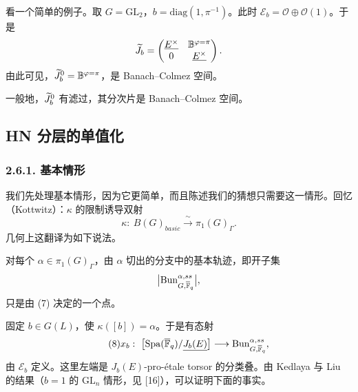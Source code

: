 \begin{example}\label{ex:2.24}
看一个简单的例子。取 $G=\mathrm{GL}_2$，$b=\mathrm{diag}(1,\pi^{-1})$。此时 $\mathcal{E}_b=\mathcal{O}\oplus\mathcal{O}(1)$。于是
\[
\widetilde{J}_b=\begin{pmatrix}\underline{E^\times} & \mathbb{B}^{\varphi=\pi}\\ 0 & \underline{E^\times}\end{pmatrix}.
\]
由此可见，$\widetilde{J}_b^0=\mathbb{B}^{\varphi=\pi}$，是 Banach–Colmez 空间。
\end{example}

一般地，$\widetilde{J}_b^0$ 有滤过，其分次片是 Banach–Colmez 空间。

\subsection{HN 分层的单值化}%

\subsubsection*{2.6.1. 基本情形}%

我们先处理基本情形，因为它更简单，而且陈述我们的猜想只需要这一情形。回忆（Kottwitz）：$\kappa$ 的限制诱导双射
\begin{equation}\tag{7}\label{eq:2.7}
\kappa:\ B(G)_{basic}\xrightarrow{\ \sim\ }\pi_1(G)_\Gamma.
\end{equation}
几何上这翻译为如下说法。

\begin{proposition}\label{prop:2.25}
对每个 $\alpha\in\pi_1(G)_\Gamma$，由 $\alpha$ 切出的分支中的基本轨迹，即开子集
\[
\bigl|\mathrm{Bun}^{\alpha,ss}_{G,\overline{\mathbb{F}}_q}\bigr|,
\]
只是由 (7) 决定的一个点。
\end{proposition}


固定 $b\in G(L)$，使 $\kappa([b])=\alpha$。于是有态射
\begin{equation}\tag{8}\label{eq:2.8}
x_b:\ \bigl[\mathrm{Spa}(\overline{\mathbb{F}}_q)/\underline{J_b(E)}\bigr]\longrightarrow \mathrm{Bun}^{\alpha,ss}_{G,\overline{\mathbb{F}}_q},
\end{equation}
由 $\mathcal{E}_b$ 定义。这里左端是 $J_b(E)$-pro-étale torsor 的分类叠。由 Kedlaya 与 Liu 的结果（$b=1$ 的 $\mathrm{GL}_n$ 情形，见 [16]），可以证明下面的事实。


